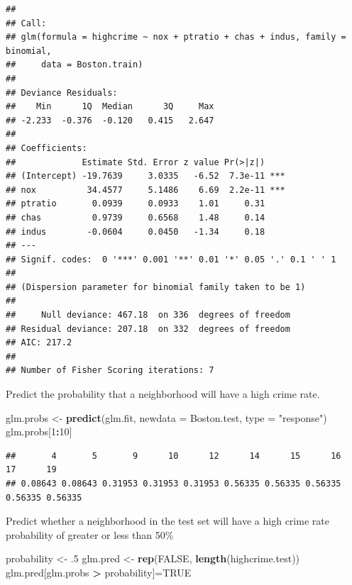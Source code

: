 \documentclass[
]{article}
\newenvironment{Shaded}{\begin{snugshade}}{\end{snugshade}}
\newcommand{\DataTypeTok}[1]{\textcolor[rgb]{0.13,0.29,0.53}{#1}}
\newcommand{\DecValTok}[1]{\textcolor[rgb]{0.00,0.00,0.81}{#1}}
\newcommand{\FloatTok}[1]{\textcolor[rgb]{0.00,0.00,0.81}{#1}}
\newcommand{\KeywordTok}[1]{\textcolor[rgb]{0.13,0.29,0.53}{\textbf{#1}}}
\newcommand{\NormalTok}[1]{#1}
\newcommand{\OperatorTok}[1]{\textcolor[rgb]{0.81,0.36,0.00}{\textbf{#1}}}
\newcommand{\OtherTok}[1]{\textcolor[rgb]{0.56,0.35,0.01}{#1}}
\newcommand{\StringTok}[1]{\textcolor[rgb]{0.31,0.60,0.02}{#1}}
\begin{document}
\begin{verbatim}
## 
## Call:
## glm(formula = highcrime ~ nox + ptratio + chas + indus, family = binomial, 
##     data = Boston.train)
## 
## Deviance Residuals: 
##    Min      1Q  Median      3Q     Max  
## -2.233  -0.376  -0.120   0.415   2.647  
## 
## Coefficients:
##             Estimate Std. Error z value Pr(>|z|)    
## (Intercept) -19.7639     3.0335   -6.52  7.3e-11 ***
## nox          34.4577     5.1486    6.69  2.2e-11 ***
## ptratio       0.0939     0.0933    1.01     0.31    
## chas          0.9739     0.6568    1.48     0.14    
## indus        -0.0604     0.0450   -1.34     0.18    
## ---
## Signif. codes:  0 '***' 0.001 '**' 0.01 '*' 0.05 '.' 0.1 ' ' 1
## 
## (Dispersion parameter for binomial family taken to be 1)
## 
##     Null deviance: 467.18  on 336  degrees of freedom
## Residual deviance: 207.18  on 332  degrees of freedom
## AIC: 217.2
## 
## Number of Fisher Scoring iterations: 7
\end{verbatim}

Predict the probability that a neighborhood will have a high crime rate.

\begin{Shaded}
\begin{Highlighting}[]
\NormalTok{glm.probs <-}\StringTok{ }\KeywordTok{predict}\NormalTok{(glm.fit,}
                     \DataTypeTok{newdata =}\NormalTok{ Boston.test,}
                     \DataTypeTok{type =} \StringTok{"response"}\NormalTok{)}
\NormalTok{glm.probs[}\DecValTok{1}\OperatorTok{:}\DecValTok{10}\NormalTok{]}
\end{Highlighting}
\end{Shaded}

\begin{verbatim}
##       4       5       9      10      12      14      15      16      17      19 
## 0.08643 0.08643 0.31953 0.31953 0.31953 0.56335 0.56335 0.56335 0.56335 0.56335
\end{verbatim}

Predict whether a neighborhood in the test set will have a high crime
rate probability of greater or less than 50\%

\begin{Shaded}
\begin{Highlighting}[]
\NormalTok{probability <-}\StringTok{ }\FloatTok{.5}
\NormalTok{glm.pred <-}\StringTok{ }\KeywordTok{rep}\NormalTok{(}\OtherTok{FALSE}\NormalTok{, }\KeywordTok{length}\NormalTok{(highcrime.test))}
\NormalTok{glm.pred[glm.probs }\OperatorTok{>}\StringTok{ }\NormalTok{probability]=}\OtherTok{TRUE}
\end{Highlighting}
\end{Shaded}
\end{document}
